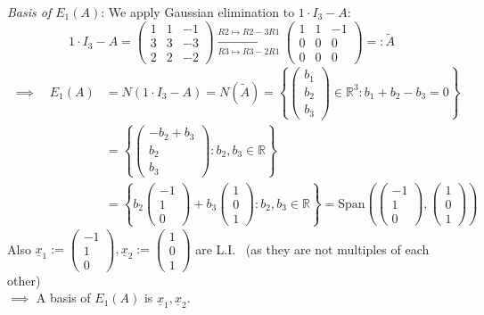 \documentclass[
  12pt,
  a4paper,
  twoside]{article}
\theoremstyle{plain}
\theoremstyle{definition}
\begin{document}
\emph{Basis of \(E_1 (A)\)}: We apply Gaussian elimination to \(1\cdot I_3-A\):
\[
1\cdot I_{3} - A = \begin{pmatrix} 1 & 1 & -1 \\ 3 & 3 & -3 \\ 2 & 2 & -2 \end{pmatrix} \xrightarrow[R3 \mapsto R3 - 2R1]{R2 \mapsto R2 - 3R1} \begin{pmatrix} 1 & 1 & -1 \\ 0 & 0 & 0 \\ 0 & 0 & 0 \end{pmatrix} =: \tilde A
\]
\begin{align*}
\implies\quad E_{1}(A) &= N(1\cdot I_3-A) = N(\tilde A) = \left\{ \begin{pmatrix} b_{1} \\ b_{2} \\b_{3} \end{pmatrix} \in \mathbb{R}^{3} : b_{1} + b_{2} - b_{3} = 0 \right\}
\\ &= \left\{ \begin{pmatrix} -b_{2} + b_{3} \\ b_{2} \\ b_{3} \end{pmatrix} : b_{2}, b_{3} \in \mathbb{R} \right\}
\\ &= \left\{ b_{2} \begin{pmatrix} -1 \\ 1 \\ 0 \end{pmatrix} + b_{3} \begin{pmatrix} 1 \\ 0 \\ 1 \end{pmatrix} : b_{2}, b_{3} \in \mathbb{R} \right\} = \mathrm{Span} \left( \begin{pmatrix} -1 \\ 1 \\ 0 \end{pmatrix}, \begin{pmatrix} 1 \\ 0 \\ 1 \end{pmatrix} \right)
\end{align*}
Also \(\underline{x}_{1} := \begin{pmatrix} -1 \\ 1 \\ 0 \end{pmatrix}, \underline{x}_{2} := \begin{pmatrix} 1 \\ 0 \\ 1 \end{pmatrix}\) are L.I. \hfill~{(as they are not multiples of each other)}\\
\(\implies\) A basis of \(E_{1}(A)\) is \(\underline{x}_1, \underline{x}_2\).
\end{document}
